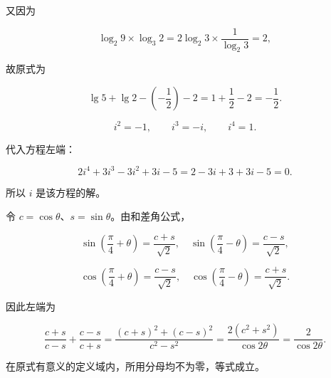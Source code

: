\begin{answer}
又因为

\nopagebreak[4]
\[
\log_2 9\times\log_3 2
=2\log_2 3\times\frac1{\log_2 3}=2,
\]

故原式为

\nopagebreak[4]
\[
\lg5+\lg2-\left(-\frac12\right)-2
=1+\frac12-2=-\frac12.
\]


\nopagebreak[4]
\[
i^2=-1,\qquad i^3=-i,\qquad i^4=1.
\]

代入方程左端：

\nopagebreak[4]
\[
2i^4+3i^3-3i^2+3i-5
=2-3i+3+3i-5=0.
\]

所以 $i$ 是该方程的解。


令 $c=\cos\theta$、$s=\sin\theta$。由和差角公式，

\nopagebreak[4]
\[
\sin\left(\frac\pi4+\theta\right)=\frac{c+s}{\sqrt2},
\quad
\sin\left(\frac\pi4-\theta\right)=\frac{c-s}{\sqrt2},
\]

\nopagebreak[4]
\[
\cos\left(\frac\pi4+\theta\right)=\frac{c-s}{\sqrt2},
\quad
\cos\left(\frac\pi4-\theta\right)=\frac{c+s}{\sqrt2}.
\]

因此左端为

\nopagebreak[4]
\[
\frac{c+s}{c-s}+\frac{c-s}{c+s}
=\frac{(c+s)^2+(c-s)^2}{c^2-s^2}
=\frac{2(c^2+s^2)}{\cos2\theta}
=\frac2{\cos2\theta}.
\]

在原式有意义的定义域内，所用分母均不为零，等式成立。





\end{answer}
